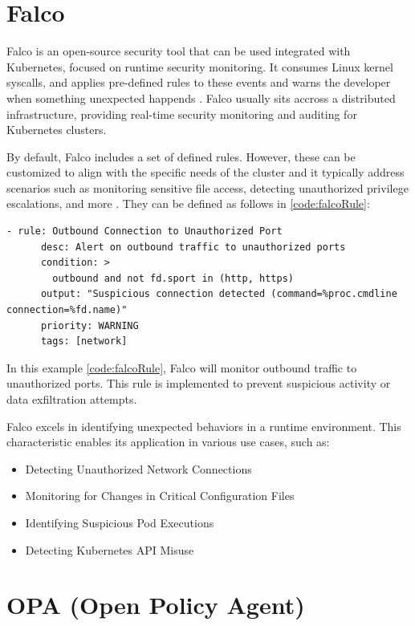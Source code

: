 \documentclass[a4paper,11pt,openright,BCOR=15mm]{scrbook}
\begin{document}
\section{Falco}\label{sect:complementNetSec}

Falco is an open-source security tool that can be used integrated with Kubernetes, focused on runtime security monitoring. It consumes Linux kernel syscalls, and applies pre-defined rules to these events and warns the developer when something unexpected happends \cite{falco_about_page}. Falco usually sits accross a distributed infrastructure, providing real-time security monitoring and auditing for Kubernetes clusters.

By default, Falco includes a set of defined rules. However, these can be customized to align with the specific needs of the cluster and it typically address scenarios such as monitoring sensitive file access, detecting unauthorized privilege escalations, and more \cite{benhassan_advanced_2024}. They can be defined as follows in \ref{code:falcoRule}:

\begin{lstlisting}[style=yaml,caption={Falco rule example},label=code:falcoRule]
	- rule: Outbound Connection to Unauthorized Port
	  desc: Alert on outbound traffic to unauthorized ports
	  condition: >
		outbound and not fd.sport in (http, https)
	  output: "Suspicious connection detected (command=%proc.cmdline connection=%fd.name)"
	  priority: WARNING
	  tags: [network]
\end{lstlisting}

In this example \ref{code:falcoRule}, Falco will monitor outbound traffic to unauthorized ports. This rule is implemented to prevent suspicious activity or data exfiltration attempts.

Falco excels in identifying unexpected behaviors in a runtime environment. This characteristic enables its application in various use cases, such as:

\begin{itemize}
	\item Detecting Unauthorized Network Connections
	\item Monitoring for Changes in Critical Configuration Files
	\item Identifying Suspicious Pod Executions
	\item Detecting Kubernetes API Misuse
\end{itemize}

\section{OPA (Open Policy Agent)}\label{sect:complmentRbac}
\end{document}
